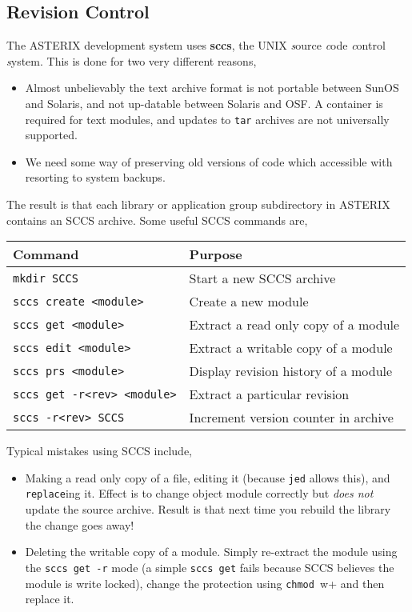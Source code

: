 \subsection{Revision Control}
The ASTERIX development system uses {\bf sccs}, the UNIX {\em s}ource 
{\em c}ode {\em c}ontrol {\em s}ystem. This is done for two very different
reasons,
\begin{itemize}
\item Almost unbelievably the text archive format is not portable between
  SunOS and Solaris, and not up-datable between Solaris and OSF. A container
  is required for text modules, and updates to \verb+tar+ archives are not
  universally supported.

\item We need some way of preserving old versions of code which accessible
  with resorting to system backups.
\end{itemize}
The result is that each library or application group subdirectory in ASTERIX
contains an SCCS archive. Some useful SCCS commands are,
\begin{center}
\begin{tabular}{|l|l|} \hline
Command & Purpose \\ \hline
\verb+mkdir SCCS+            & Start a new SCCS archive \\
\verb+sccs create <module>+  & Create a new module \\
\verb+sccs get <module>+     & Extract a read only copy of a module \\
\verb+sccs edit <module>+    & Extract a writable copy of a module \\
\verb+sccs prs <module>+     & Display revision history of a module \\
\verb+sccs get -r<rev> <module>+ & Extract a particular revision \\
\verb+sccs -r<rev> SCCS+     & Increment version counter in archive \\ \hline
\end{tabular}
\end{center}

Typical mistakes using SCCS include,
\begin{itemize}
\item Making a read only copy of a file, editing it (because \verb+jed+ allows
  this), and \verb+replace+ing it. Effect is to change object module correctly
  but {\em does not} update the source archive. Result is that next time
  you rebuild the library the change goes away!
  
\item Deleting the writable copy of a module. Simply re-extract the
  module using the \verb+sccs get -r+ mode (a simple \verb+sccs get+
  fails because SCCS believes the module is write locked), change the
  protection using \verb+chmod +w+ and then replace it.
\end{itemize}

